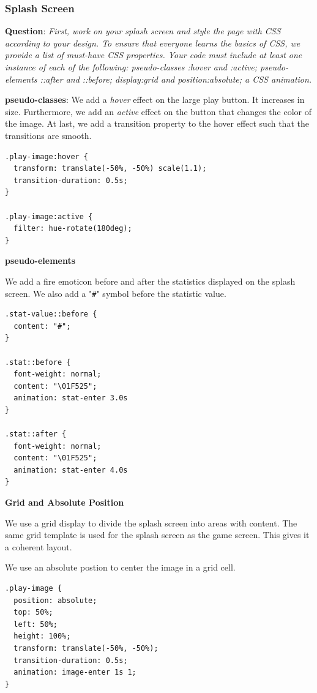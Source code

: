 \documentclass{article}
\begin{document}
\subsubsection{Splash Screen}

\textbf{Question}: \textit{First, work on your splash screen and style the page with CSS according to your design. To ensure that everyone learns the basics of CSS, we provide a list of must-have CSS properties. Your code must include at least one instance of each of the following: pseudo-classes :hover and :active; pseudo-elements ::after and ::before; display:grid and position:absolute; a CSS animation.}

\textbf{pseudo-classes}:
We add a \textit{hover} effect on the large play button. It increases in size. Furthermore, we add an \textit{active} effect on the button that changes the color of the image. At last, we add a transition property to the hover effect such that the transitions are smooth.

\begin{lstlisting}
.play-image:hover {
  transform: translate(-50%, -50%) scale(1.1);
  transition-duration: 0.5s;
}

.play-image:active {
  filter: hue-rotate(180deg);
}
\end{lstlisting}

\textbf{pseudo-elements}

We add a fire emoticon before and after the statistics displayed on the splash screen. We also add a "\texttt{\#}" symbol before the statistic value.

\begin{lstlisting}
.stat-value::before {
  content: "#";
}

.stat::before {
  font-weight: normal;
  content: "\01F525";
  animation: stat-enter 3.0s
}

.stat::after {
  font-weight: normal;
  content: "\01F525";
  animation: stat-enter 4.0s
}
\end{lstlisting}

\textbf{Grid and Absolute Position} 

We use a grid display to divide the splash screen into areas with content. The same grid template is used for the splash screen as the game screen. This gives it a coherent layout.

We use an absolute postion to center the image in a grid cell.
\begin{lstlisting}
.play-image {
  position: absolute;
  top: 50%;
  left: 50%;
  height: 100%;
  transform: translate(-50%, -50%);
  transition-duration: 0.5s;
  animation: image-enter 1s 1;
}
\end{lstlisting}
\end{document}
